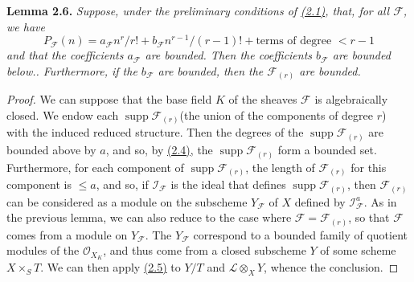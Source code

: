 \documentclass{article}
\newenvironment{itenv}[1]
  {\phantomsection\par\smallskip\noindent\textbf{#1.}\itshape}
  {\par\smallskip}
\newcommand{\oldpage}[1]{\marginpar{\footnotesize$\Big\vert$ \textit{p.~#1}}}
\theoremstyle{definition}
\theoremstyle{definition}
\theoremstyle{definition}
\theoremstyle{definition}
\theoremstyle{remark}
\begin{document}
\leavevmode{}%
\begin{itenv}{Lemma 2.6}
Suppose, under the preliminary conditions of \protect\hyperlink{fga-3-iv-theorem-2.1}{(2.1)}, that, for all \({\mathscr{F}}\), we have
\[
  P_{\mathscr{F}}(n) = a_{\mathscr{F}} n^r/r! + b_{\mathscr{F}} n^{r-1}/(r-1)! + \text{terms of degree }<r-1
\]
and that the coefficients \(a_{\mathscr{F}}\) are bounded.
Then the coefficients \(b_{\mathscr{F}}\) are bounded below..
Furthermore, if the \(b_{\mathscr{F}}\) are bounded, then the \({\mathscr{F}}_{(r)}\) are bounded.

\end{itenv}

\begin{proof}
We can suppose that the base field \(K\) of the sheaves \({\mathscr{F}}\) is algebraically closed.
We endow each \(\operatorname{supp}{\mathscr{F}}_{(r)}\)(the union of the components of degree \(r\)) with the induced reduced structure.
Then the degrees of the \(\operatorname{supp}{\mathscr{F}}_{(r)}\) are bounded above by \(a\), and so, by \protect\hyperlink{fga-3-iv-lemma-2.4}{(2.4)}, the \(\operatorname{supp}{\mathscr{F}}_{(r)}\) form a bounded set.
Furthermore, for each component of \(\operatorname{supp}{\mathscr{F}}_{(r)}\), the length of \({\mathscr{F}}_{(r)}\) for this component is \(\leqslant a\), and so, if \({\mathscr{I}}_{\mathscr{F}}\) is the ideal that defines \(\operatorname{supp}{\mathscr{F}}_{(r)}\), then \({\mathscr{F}}_{(r)}\) can be considered as a module on the subscheme \(Y_{\mathscr{F}}\) of \(X\) defined by \({\mathscr{I}}_{\mathscr{F}}^a\).
\oldpage{221-10}As in the previous lemma, we can also reduce to the case where \({\mathscr{F}}={\mathscr{F}}_{(r)}\), so that \({\mathscr{F}}\) comes from a module on \(Y_{\mathscr{F}}\).
The \(Y_{\mathscr{F}}\) correspond to a bounded family of quotient modules of the \({\mathscr{O}}_{X_K}\), and thus come from a closed subscheme \(Y\) of some scheme \(X\times_S T\).
We can then apply \protect\hyperlink{fga-3-iv-lemma-2.5}{(2.5)} to \(Y/T\) and \({\mathscr{L}}\otimes_X Y\), whence the conclusion.
\end{proof}
\end{document}
